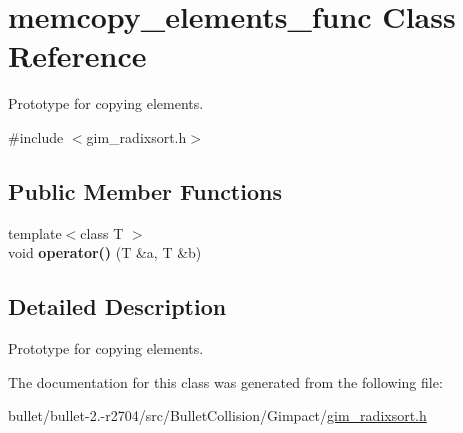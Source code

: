 \hypertarget{classmemcopy__elements__func}{\section{memcopy\+\_\+elements\+\_\+func Class Reference}
\label{classmemcopy__elements__func}
}


Prototype for copying elements.  




{\ttfamily \#include $<$gim\+\_\+radixsort.\+h$>$}

\subsection*{Public Member Functions}
\begin{DoxyCompactItemize}
\item 
\hypertarget{classmemcopy__elements__func_abf6c5cd888885be895cf5ab85b071b58}{{\footnotesize template$<$class T $>$ }\\void {\bfseries operator()} (T \&a, T \&b)}\label{classmemcopy__elements__func_abf6c5cd888885be895cf5ab85b071b58}

\end{DoxyCompactItemize}


\subsection{Detailed Description}
Prototype for copying elements. 

The documentation for this class was generated from the following file\+:\begin{DoxyCompactItemize}
\item 
bullet/bullet-\/2.-\/r2704/src/\+Bullet\+Collision/\+Gimpact/\hyperlink{gim__radixsort_8h}{gim\+\_\+radixsort.\+h}\end{DoxyCompactItemize}
